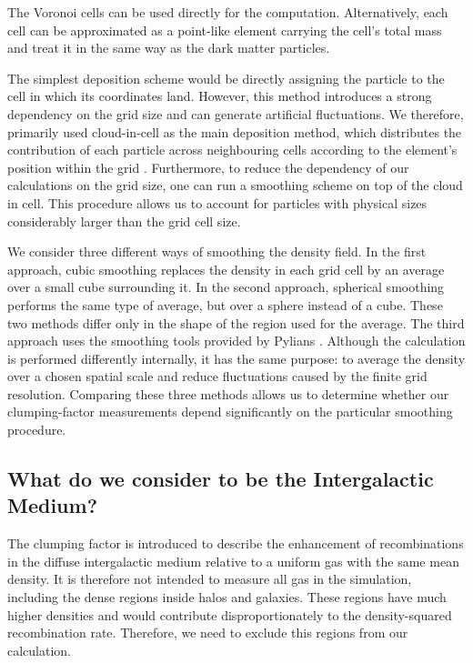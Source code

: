\documentclass[%
 reprint,
nofootinbib,
 amsmath,amssymb,
 aps,
]{revtex4-2}
\begin{document}
The Voronoi cells can be used directly for the computation. Alternatively, each cell can be approximated as a point-like element carrying the cell's total mass and treat it in the same way as the dark matter particles. 

The simplest deposition scheme would be directly assigning the particle to the cell in which its coordinates land. However, this method introduces a strong dependency on the grid size and can generate artificial fluctuations. We therefore, primarily used cloud-in-cell as the main deposition method, which distributes the contribution of each particle across neighbouring cells according to the element's position within the grid \cite{jing2005correcting}. 
Furthermore, to reduce the dependency of our calculations on the grid size, one can run a smoothing scheme on top of the cloud in cell. This procedure allows us to account for particles with physical sizes considerably larger than the grid cell size.

We consider three different ways of smoothing the density field. In the first approach, cubic smoothing replaces the density in each grid cell by an average over a small cube surrounding it. In the second approach, spherical smoothing performs the same type of average, but over a sphere instead of a cube. These two methods differ only in the shape of the region used for the average.
The third approach uses the smoothing tools provided by Pylians \cite{pylians2018}. Although the calculation is performed differently internally, it has the same purpose: to average the density over a chosen spatial scale and reduce fluctuations caused by the finite grid resolution. Comparing these three methods allows us to determine whether our clumping-factor measurements depend significantly on the particular smoothing procedure.

\subsection{What do we consider to be the Intergalactic Medium?}
The clumping factor is introduced to describe the enhancement of recombinations in the diffuse intergalactic medium relative to a uniform gas with the same mean density. It is therefore not intended to measure all gas in the simulation, including the dense regions inside halos and galaxies. These regions have much higher densities and would contribute disproportionately to the density-squared recombination rate. Therefore, we need to exclude this regions from our calculation. 
\end{document}
